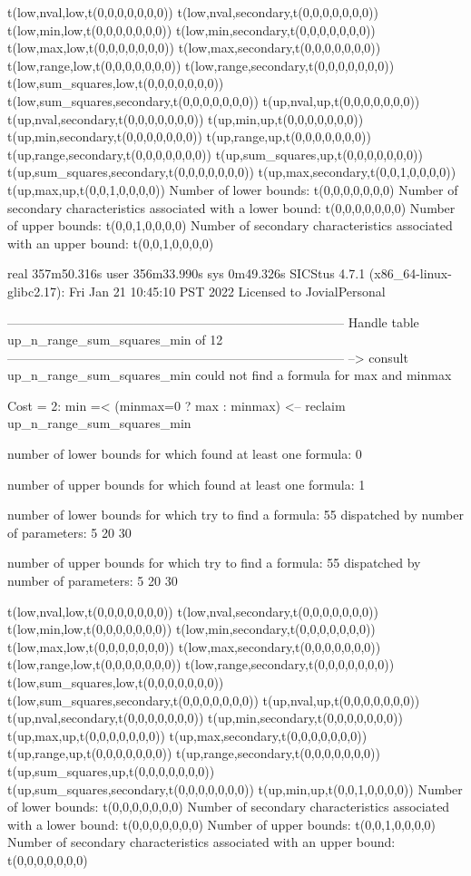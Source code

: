 t(low,nval,low,t(0,0,0,0,0,0,0))
t(low,nval,secondary,t(0,0,0,0,0,0,0))
t(low,min,low,t(0,0,0,0,0,0,0))
t(low,min,secondary,t(0,0,0,0,0,0,0))
t(low,max,low,t(0,0,0,0,0,0,0))
t(low,max,secondary,t(0,0,0,0,0,0,0))
t(low,range,low,t(0,0,0,0,0,0,0))
t(low,range,secondary,t(0,0,0,0,0,0,0))
t(low,sum_squares,low,t(0,0,0,0,0,0,0))
t(low,sum_squares,secondary,t(0,0,0,0,0,0,0))
t(up,nval,up,t(0,0,0,0,0,0,0))
t(up,nval,secondary,t(0,0,0,0,0,0,0))
t(up,min,up,t(0,0,0,0,0,0,0))
t(up,min,secondary,t(0,0,0,0,0,0,0))
t(up,range,up,t(0,0,0,0,0,0,0))
t(up,range,secondary,t(0,0,0,0,0,0,0))
t(up,sum_squares,up,t(0,0,0,0,0,0,0))
t(up,sum_squares,secondary,t(0,0,0,0,0,0,0))
t(up,max,secondary,t(0,0,1,0,0,0,0))
t(up,max,up,t(0,0,1,0,0,0,0))
Number of lower bounds:                                             t(0,0,0,0,0,0,0)
Number of secondary characteristics associated with a lower bound:  t(0,0,0,0,0,0,0)
Number of upper bounds:                                             t(0,0,1,0,0,0,0)
Number of secondary characteristics associated with an upper bound: t(0,0,1,0,0,0,0)

real	357m50.316s
user	356m33.990s
sys	0m49.326s
SICStus 4.7.1 (x86_64-linux-glibc2.17): Fri Jan 21 10:45:10 PST 2022
Licensed to JovialPersonal


--------------------------------------------------------------------------------
Handle table up_n_range_sum_squares_min of 12
--------------------------------------------------------------------------------
--> consult up_n_range_sum_squares_min
could not find a formula for max and minmax

Cost =  2:  min =< (minmax=0 ? max : minmax)
<-- reclaim up_n_range_sum_squares_min

number of lower bounds for which found at least one formula: 0

number of upper bounds for which found at least one formula: 1

number of lower bounds for which try to find a formula: 55
dispatched by number of parameters: 5  20  30

number of upper bounds for which try to find a formula: 55
dispatched by number of parameters: 5  20  30

t(low,nval,low,t(0,0,0,0,0,0,0))
t(low,nval,secondary,t(0,0,0,0,0,0,0))
t(low,min,low,t(0,0,0,0,0,0,0))
t(low,min,secondary,t(0,0,0,0,0,0,0))
t(low,max,low,t(0,0,0,0,0,0,0))
t(low,max,secondary,t(0,0,0,0,0,0,0))
t(low,range,low,t(0,0,0,0,0,0,0))
t(low,range,secondary,t(0,0,0,0,0,0,0))
t(low,sum_squares,low,t(0,0,0,0,0,0,0))
t(low,sum_squares,secondary,t(0,0,0,0,0,0,0))
t(up,nval,up,t(0,0,0,0,0,0,0))
t(up,nval,secondary,t(0,0,0,0,0,0,0))
t(up,min,secondary,t(0,0,0,0,0,0,0))
t(up,max,up,t(0,0,0,0,0,0,0))
t(up,max,secondary,t(0,0,0,0,0,0,0))
t(up,range,up,t(0,0,0,0,0,0,0))
t(up,range,secondary,t(0,0,0,0,0,0,0))
t(up,sum_squares,up,t(0,0,0,0,0,0,0))
t(up,sum_squares,secondary,t(0,0,0,0,0,0,0))
t(up,min,up,t(0,0,1,0,0,0,0))
Number of lower bounds:                                             t(0,0,0,0,0,0,0)
Number of secondary characteristics associated with a lower bound:  t(0,0,0,0,0,0,0)
Number of upper bounds:                                             t(0,0,1,0,0,0,0)
Number of secondary characteristics associated with an upper bound: t(0,0,0,0,0,0,0)

